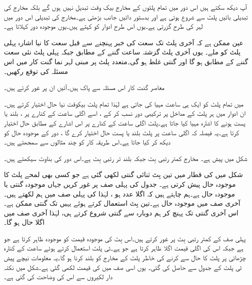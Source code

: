 آپ دیکھ سکتے ہیں اس دور میں تمام پلٹوں کے مخارج بیک وقت تبدیل نہیں ہوں گے  بلکہ مخارج کی تبدیلی بائیں پلٹ سے شروع ہوتی ہے اور بدستور دائیں جانب بڑھتی ہے۔مخارج کی تبدیلی اس دور میں لہر کی طرح گزرتی ہے۔یوں اس طرح ادوار کو  کہتے ہیں۔یوں  موجودہ دور کہلاتا   ہے۔

عین ممکن ہے کہ آخری پلٹ تک سعت کی خبر پہنچنے سے قبل  سعت کا نیا اشارہ پہلی پلٹ کو ملے۔  یوں  آخری پلٹ گزشتہ ساعت گننے  کے مطابق جبکہ پہلی پلٹ نئی سعت   گننے کے مطابق ہو گا اور گنتی غلط ہو گی۔متعدد پلٹ پر مبنی لہر نما گنت کار میں اس مسئلہ کی توقع    رکھیں۔ 

 معاصر گنت کار اس مسئلہ سے پاک ہیں۔آئیں ان پر غور کرتے ہیں۔
 
 میں تمام پلٹ کو ایک ہی ساعت مہیا کی جاتی ہے لہٰذا  تمام پلٹ  بیکوقت نیا حال  اختیار کرتے ہیں۔ان   ادوار میں ہر پلٹ کے مداخل پر ترکیبی دور نسب کر  کے ، اسے اگلی  ساعت کے کنارے پر ، بلند یا پست ہونے کا   اشارہ مہیا کیا جاتا ہے۔پلٹ  اگلی ساعت کے کنارے پر  اس اشارے کے مطابق حال اختیار کرتا  ہے۔یہ فیصلہ کہ اگلی ساعت پر پلٹ بلند یا  پست حال اختیار کرے گا ، دور کے موجودہ حال کو دیکھ کر کیا جاتا ہے۔اس طریقہ کار کو چند مثالوں سے سمجھتے ہیں۔

 شکل  میں پیش ہے۔  مخارج   کمتر  رتبی بِٹ   جبکہ  بلند تر رتبی بِٹ ہے۔اس دور کی بناوٹ سیکھتے  ہیں۔



شکل   میں  کی قطار میں تین بِٹ ثنائی گنتی لکھی گئی ہے جو کسی بھی لمحے پلٹ کا موجودہ  حال  پیش کرتی ہے۔  جدول کی پہلی صف پر غور کریں جہاں موجودہ گنتی یا موجودہ حال   ہے۔ہم چاہتے ہیں کہ اگلا عدد  ہو ، لہٰذا کی پہلی صف  میں ہم   لکھتے ہیں۔آخری صف میں موجودہ حال   ہے۔تین بِٹ  استعمال کرتے ہوئے یہیں تک  گنتی ممکن ہے۔اس آخری گنتی تک پہنچ کر ہم دوبارہ    سے  گنتی شروع کرتے ہی، لہٰذا  آخری صف میں اگلا حال   ہو گا۔


 پہلی صف کے کمتر رتبی بِٹ   پر   غور کرتے ہیں۔اس بِٹ کی موجودہ قیمت کو موجودہ  ظاہر کرتا ہے جو   ہے جبکہ اس کی اگلی قیمت  اگلا  ظاہر کرتا ہے جو   ہے۔ٹی پلٹ استعمال کرتے  ہوئے ساعت کے کنارہ چڑھائی پر پلٹ کا حال   سے  کرنے کی خاطر پلٹ کے مخارج   کو بلند کرنا ہو گا۔یہ معلومات نیچے  پیش ٹی پلٹ کے جدول سے حاصل  کی گئی۔ یوں اسی صف  میں   کی قیمت   لکھی گئی ہے۔شکل میں نکتہ دار لکیروں سے  اس کی وضاحت کی گئی ہے۔



